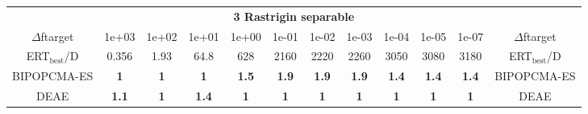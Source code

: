 \begin{tabular}{cccccccccccc}
 & \multicolumn{10}{c}{{\normalsize \textbf{3 Rastrigin separable}}}\\
$\Delta$ftarget& 1e+03& 1e+02& 1e+01& 1e+00& 1e-01& 1e-02& 1e-03& 1e-04& 1e-05& 1e-07 & $\Delta$ftarget \\
ERT$_{\textrm{best}}$/D& 0.356& 1.93& 64.8& 628& 2160& 2220& 2260& 3050& 3080& 3180 & ERT$_{\textrm{best}}$/D \\
\hline
BIPOPCMA-ES & \textbf{1} & \textbf{1} & \textbf{1} & \textbf{1.5} & \textbf{1.9} & \textbf{1.9} & \textbf{1.9} & \textbf{1.4} & \textbf{1.4} & \textbf{1.4} & BIPOPCMA-ES \cite{add_an_entry_for_BIPOPCMA-ES_in_bbob.bib}\\
DEAE & \textbf{1.1} & \textbf{1} & \textbf{1.4} & \textbf{1} & \textbf{1} & \textbf{1} & \textbf{1} & \textbf{1} & \textbf{1} & \textbf{1} & DEAE \cite{add_an_entry_for_DEAE_in_bbob.bib}
\end{tabular}
